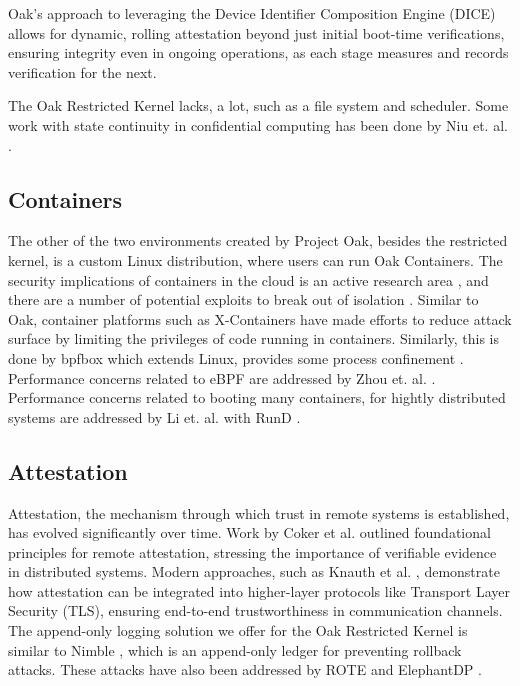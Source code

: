 Oak's approach to leveraging the Device Identifier Composition Engine (DICE) \cite{jager_rolling_2017} allows for dynamic, rolling attestation beyond just initial boot-time verifications, ensuring integrity even in ongoing operations, as each stage measures and records verification for the next.

The Oak Restricted Kernel lacks, a lot, such as a file system and scheduler. Some work with state continuity in confidential computing has been done by Niu et. al. \cite{niu_narrator_2022}.

\subsection{Containers}

The other of the two environments created by Project Oak, besides the restricted kernel, is a custom Linux distribution, where users can run Oak Containers.
The security implications of containers in the cloud is an active research area \cite{tak_understanding_nodate}, and there are a number of potential exploits to break out of isolation \cite{gao_houdinis_2019}.
Similar to Oak, container platforms such as X-Containers \cite{shen_x-containers_2019} have made efforts to reduce attack surface by limiting the privileges of code running in containers. Similarly, this is done by bpfbox which extends Linux, provides some process confinement \cite{findlay_bpfbox_2020}. Performance concerns related to eBPF are addressed by Zhou et. al. \cite{zhou_electrode_nodate}.
Performance concerns related to booting many containers, for hightly distributed systems are addressed by Li et. al. with RunD \cite{li_rund_nodate}.


\subsection{Attestation}

Attestation, the mechanism through which trust in remote systems is established, has evolved significantly over time. Work by Coker et al. \cite{coker_principles_2011} outlined foundational principles for remote attestation, stressing the importance of verifiable evidence in distributed systems. Modern approaches, such as Knauth et al. \cite{knauth_integrating_nodate}, demonstrate how attestation can be integrated into higher-layer protocols like Transport Layer Security (TLS), ensuring end-to-end trustworthiness in communication channels. The append-only logging solution we offer for the Oak Restricted Kernel is similar to Nimble \cite{angel_nimble_2023}, which is an append-only ledger for preventing rollback attacks. These attacks have also been addressed by ROTE \cite{matetic_rote_nodate} and ElephantDP \cite{jin_elephants_2024}.

